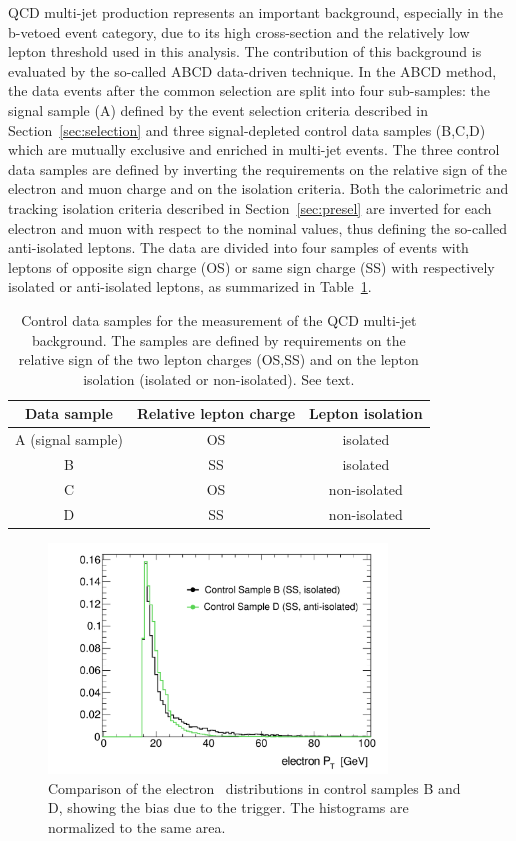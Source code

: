 QCD multi-jet production represents an important background, 
especially in the b-vetoed event category, due to its high cross-section and the 
relatively low lepton \pt threshold  used in this analysis. The contribution of this
background is evaluated by the so-called ABCD data-driven technique.
In the ABCD method, the  data events after the common selection are split into four sub-samples: the
signal sample (A) defined by the event selection criteria described in Section~\ref{sec:selection}
and three signal-depleted control data samples (B,C,D) which are mutually exclusive  and 
enriched in multi-jet events. The three control data samples are defined by inverting the requirements on the relative 
sign of the electron and muon charge  and  on the isolation criteria. 
Both the calorimetric and tracking isolation criteria described in Section~\ref{sec:presel}  are inverted for each electron and muon 
with respect to the nominal values, thus defining the so-called anti-isolated leptons. 
The data are divided into four samples of events with leptons of opposite sign charge (OS) 
or same sign charge (SS) with respectively isolated or anti-isolated leptons, as summarized in Table~\ref{table:qcd}.

\begin{table} [!tp]
\caption{Control data samples for the measurement of the QCD multi-jet background. The samples are defined by requirements on the relative
	sign of the two lepton charges (OS,SS) and on the lepton isolation  (isolated or non-isolated). See text.}
\centering
\begin{tabular}{c c c }
\hline
Data sample & Relative lepton charge & Lepton isolation \\ [0.5ex]
\hline
A (signal sample) & OS & isolated \\
\hline
B & SS & isolated \\
C & OS & non-isolated \\
D & SS & non-isolated \\ [1ex]
\hline
\end{tabular}
\label{table:qcd}
\end{table}

\begin{figure}[tp]
	\begin{center}
	\includegraphics[width=9cm]{figure/ABCD_regionB_Vs_regionD2}
	\end{center}
	\caption{Comparison of the electron \pt~distributions in control samples B and D, showing the bias due to the trigger. 
	The histograms are normalized to the same area.}
	\label{fig:BvsD}
\end{figure}

